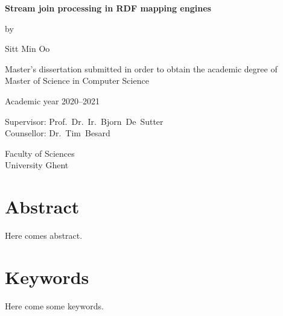 \newpage

{
\setlength{\baselineskip}{14pt}
\setlength{\parindent}{0pt}
\setlength{\parskip}{8pt}

\begin{center}

\noindent \textbf{\huge
Stream join processing in RDF mapping engines
}

by

Sitt Min Oo

Master's dissertation submitted in order to obtain the academic degree of\\
Master of Science in Computer Science

Academic year 2020--2021

Supervisor: Prof.~Dr.~Ir.~Bjorn~De~Sutter\\
Counsellor: Dr.~Tim~Besard

Faculty of Sciences\\
University Ghent

\end{center}

\section*{Abstract}


Here comes abstract.


\section*{Keywords}


Here come some keywords.

}

\newpage
